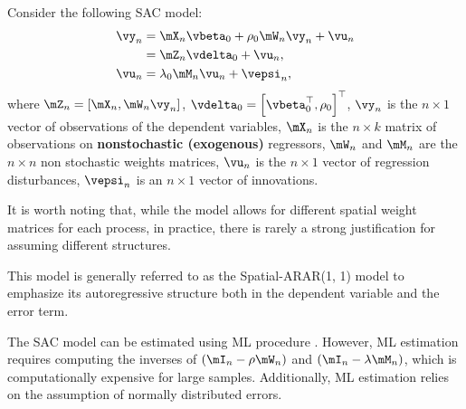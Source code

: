Consider the following SAC model:
\begin{equation}\label{eq:model_gmm_sac}
\begin{aligned}
	\vy_n & = \mX_n\vbeta_0 + \rho_0\mW_n\vy_n + \vu_n   \\
	     & = \mZ_n\vdelta_0 + \vu_n,\\
	\vu_n  & = \lambda_0 \mM_n \vu_n + \vepsi_n,
\end{aligned}
\end{equation}
%
where $\mZ_n = \left[\mX_n, \mW_n\vy_n\right]$, $\vdelta_0 = \left[\vbeta_0^\top ,\rho_0\right]^\top$, $\vy_n$ is the $n\times 1$ vector of observations of the dependent variables, $\mX_n$ is the $n \times k$ matrix of observations on \textbf{nonstochastic (exogenous)} regressors, $\mW_n$ and $\mM_n$ are the $n \times n$ non stochastic weights matrices, $\vu_n$ is the $n \times 1$ vector of regression disturbances, $\vepsi_n$ is an $n \times 1$ vector of innovations. 

It is worth noting that, while the model allows for different spatial weight matrices for each process, in practice, there is rarely a strong justification for assuming different structures.

\begin{remark}
This model is generally referred to as the Spatial-ARAR(1, 1) model to emphasize its autoregressive structure both in the dependent variable and the error term. 
\end{remark}

The SAC model can be estimated using ML procedure \citep[see][]{anselin1988spatial}. However, ML estimation requires computing the inverses of $\left(\mI_n - \rho\mW_n\right)$ and $\left(\mI_n - \lambda \mM_n\right)$, which is computationally expensive for large samples. Additionally, ML estimation relies on the assumption of normally distributed errors.

